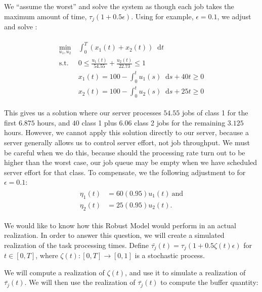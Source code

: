 \documentclass[11pt,a4paper,titlepage]{article}
\newcommand*{\dd}{\ensuremath{\mathop{}\!\mathrm{d}}}%
\theoremstyle{definition}
\theoremstyle{plain}
\begin{document}
We ``assume the worst'' and solve the system as though each job takes the maximum amount of time,
$\tau_j (1+ 0.5 \epsilon)$.
Using for example,
$\epsilon=0.1$,
we adjust and solve \modeltwo:

\begin{align}
    \label{eq:model-2-robust}
    \begin{split}
        \min\limits_{u_1, u_2}
        &~ \int_0^T \left( x_1(t) + x_2(t) \right) \dd t \\
        \text{s.t.}
        &~ 0 \leq \frac{u_1(t)}{54.55} + \frac{u_2(t)}{22.73} \leq 1 \\
        &~ x_1(t) = 100 - \int_0^t u_1(s) \dd s + 40t \geq 0 \\
        &~ x_2(t) = 100 - \int_0^t u_2(s) \dd s + 25t \geq 0
    \end{split}
\end{align}

This gives us a solution where our server processes $54.55$
jobs of class 1 for the first $6.875$ hours,
and $40$ class 1 plus $6.06$ class 2 jobs for the remaining $3.125$ hours.
However,
we cannot apply this solution directly to our server,
because a server generally allows us to control server effort,
not job throughput.
We must be careful when we do this,
because should the processing rate turn out to be higher than the worst case,
our job queue may be empty when we have scheduled server effort for that class.
To compensate,
we the following adjustment to  for $\epsilon=0.1$:
\begin{align}
    \label{eq:model-2-translation-robust}
    \begin{split}
        \eta_1(t) & = 60(0.95) u_1(t) ~ \text{and} \\
        \eta_2(t) & = 25(0.95) u_2(t).
    \end{split}
\end{align}

We would like to know how this Robust Model would perform in an actual realization.
In order to answer this question,
we will create a simulated realization of the task processing times.
Define
$\bar{\tau_j}(t) = \tau_j (1 + 0.5\zeta(t) \epsilon)$
for $t \in [0,T]$,
where $\zeta(t):[0,T] \to [0,1]$ is a stochastic process.

We will compute a realization of $\zeta(t)$,
and use it to simulate a realization of $\bar{\tau_j}(t)$.
We will then use the realization of $\bar{\tau_j}(t)$ to compute the buffer quantity:
\end{document}
